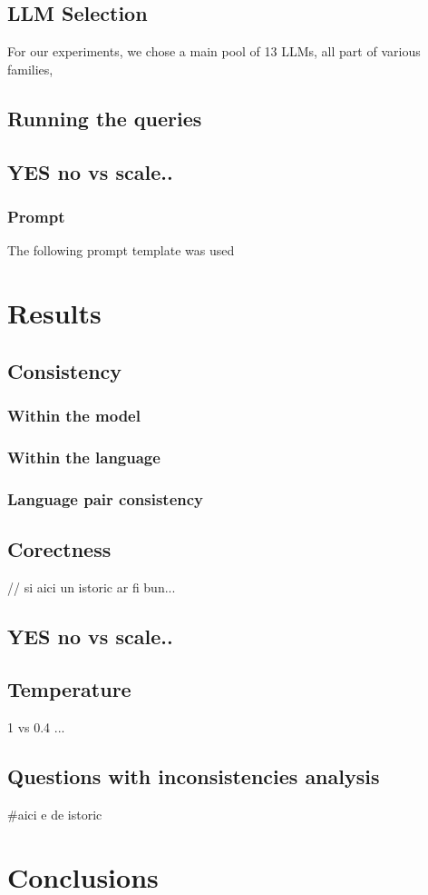 \documentclass[11pt]{article}
\begin{document}
\subsection{LLM Selection}
For our experiments, we chose a main pool of 13 LLMs, all part of various families, 


\subsection{Running the queries}
\subsection{YES no vs scale..}

\subsubsection{Prompt}
The following prompt template was used





\section{Results}

\subsection{Consistency}

\subsubsection{ Within the model} 
\subsubsection{ Within the language} 
\subsubsection{ Language pair consistency}


\subsection{Corectness} // si aici un istoric ar fi bun...

\subsection{YES no vs scale..}

\subsection{Temperature} 
1 vs 0.4 ...



\subsection{Questions with inconsistencies analysis}  #aici e de istoric



\section{Conclusions}





\end{document}
